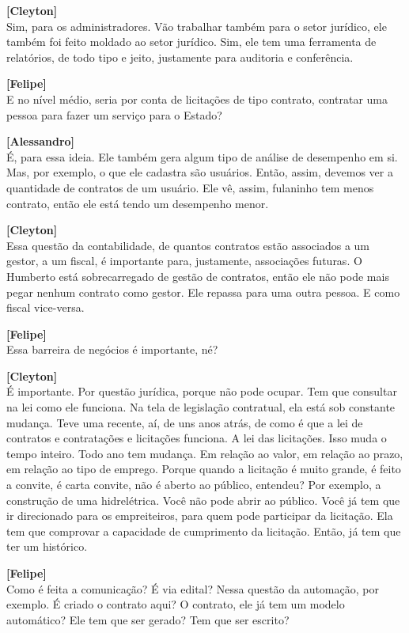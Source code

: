 \documentclass[12pt,a4paper]{article}
\begin{document}
\begin{entrevista}
    \textbf{[Cleyton]} \\
    Sim, para os administradores. Vão trabalhar também para o setor jurídico, ele também foi feito moldado ao setor jurídico. Sim, ele tem uma ferramenta de relatórios, de todo tipo e jeito, justamente para auditoria e conferência.

    \textbf{[Felipe]} \\
    E no nível médio, seria por conta de licitações de tipo contrato, contratar uma pessoa para fazer um serviço para o Estado?

    \textbf{[Alessandro]} \\
    É, para essa ideia. Ele também gera algum tipo de análise de desempenho em si. Mas, por exemplo, o que ele cadastra são usuários. Então, assim, devemos ver a quantidade de contratos de um usuário. Ele vê, assim, fulaninho tem menos contrato, então ele está tendo um desempenho menor.

    \textbf{[Cleyton]} \\
    Essa questão da contabilidade, de quantos contratos estão associados a um gestor, a um fiscal, é importante para, justamente, associações futuras. O Humberto está sobrecarregado de gestão de contratos, então ele não pode mais pegar nenhum contrato como gestor. Ele repassa para uma outra pessoa. E como fiscal vice-versa.

    \textbf{[Felipe]} \\
    Essa barreira de negócios é importante, né?

    \textbf{[Cleyton]} \\
    É importante. Por questão jurídica, porque não pode ocupar. Tem que consultar na lei como ele funciona. Na tela de legislação contratual, ela está sob constante mudança. Teve uma recente, aí, de uns anos atrás, de como é que a lei de contratos e contratações e licitações funciona. A lei das licitações. Isso muda o tempo inteiro. Todo ano tem mudança. Em relação ao valor, em relação ao prazo, em relação ao tipo de emprego. Porque quando a licitação é muito grande, é feito a convite, é carta convite, não é aberto ao público, entendeu? Por exemplo, a construção de uma hidrelétrica. Você não pode abrir ao público. Você já tem que ir direcionado para os empreiteiros, para quem pode participar da licitação. Ela tem que comprovar a capacidade de cumprimento da licitação. Então, já tem que ter um histórico.

    \textbf{[Felipe]} \\
    Como é feita a comunicação? É via edital? Nessa questão da automação, por exemplo. É criado o contrato aqui? O contrato, ele já tem um modelo automático? Ele tem que ser gerado? Tem que ser escrito?


\end{entrevista}
\end{document}

